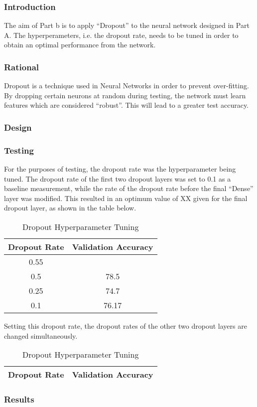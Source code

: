 \subsubsection{Introduction}

The aim of Part b is to apply ``Dropout'' to the neural network designed in Part
A. The hyperperameters, i.e. the dropout rate, needs to be tuned in order to
obtain an optimal performance from the network.

\subsubsection{Rational}

Dropout is a technique used in Neural Networks in order to prevent over-fitting.
By dropping certain neurons at random during testing, the network must learn
features which are considered ``robust''. This will lead to a greater test
accuracy.

\subsubsection{Design}

\subsubsection{Testing}

For the purposes of testing, the dropout rate was the hyperparameter being
tuned. The dropout rate of the first two dropout layers was set to 0.1 as a
baseline measurement, while the rate of the dropout rate before the final
``Dense'' layer was modified. This resulted in an optimum value of XX given for
the final dropout layer, as shown in the table below.

\begin{table}[H]
	\centering
	\caption{Dropout Hyperparameter Tuning}
	\label{tab:d1hyp}
	\begin{tabular}{|c|c|}
	\hline
	Dropout Rate & Validation Accuracy \\
	\hline
	0.55 & \\
	0.5 & 78.5 \\
	0.25 & 74.7 \\
	0.1 & 76.17 \\
	\hline
	\end{tabular}
\end{table}

Setting this dropout rate, the dropout rates of the other two dropout layers are
changed simultaneously.

\begin{table}[H]
	\centering
	\caption{Dropout Hyperparameter Tuning}
	\label{tab:d2hyp}
	\begin{tabular}{|c|c|}
	\hline
	Dropout Rate & Validation Accuracy \\
	\hline
	\hline
	\end{tabular}
\end{table}

\subsubsection{Results}
